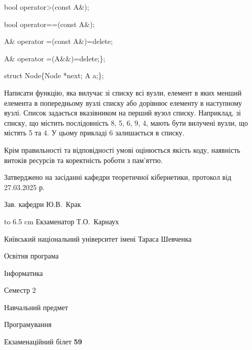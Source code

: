 \documentclass[12pt, ukrainian]{article}
\begin{document}
{\quad  bool operator>(const A\&); 

\quad  bool operator==(const A\&); 

\quad A\& operator =(const A\&)=delete; 

\quad  A\& operator =(A\&\&)=delete;\};

struct Node\{Node *next; A a;\};

 Написати функцію, яка вилучає зі списку всі вузли, елемент в яких менший елемента в попередньому вузлі списку або дорівнює елементу в наступному вузлі. Список задається вказівником на перший вузол списку. Наприклад, зі списку, що містить послідовність 8, 5, 6, 9, 4, мають бути вилучені вузли, що містять 5 та 4. У цьому прикладі 6 залишається в списку.

Крім правильності та відповідності умові оцінюється якість коду, наявність витоків ресурсів та коректність роботи з пам'яттю. 

}
{\smallskip\smallskip \begin {scriptsize} Затверджено на засіданні кафедри теоретичної кібернетики, протокол   від   27.03.2025 р.\par\smallskip\smallskip\smallskip\smallskip
{\parbox {6.5 cm} {Зав. кафедри \dotfill Ю.В.~Крак}}\hspace {0.7cm} {\hbox to 6.5 cm { Екзаменатор \dotfill Т.О.~Карнаух}} \end{scriptsize}}
\newpage
{{\begin {scriptsize}\par
{ \center  Київський національний університет імені Тараса Шевченка \par}
{\parbox {5 cm}{Освітня програма \hfill}{\parbox {7 cm}{Інформатика\hfill}}\parbox {6 cm}{\hfill Семестр 2}}\par
{\parbox {5 cm} {Навчальний предмет \hfill}\parbox {7 cm}{Програмування \hfill}\parbox {6cm}{\hfill}\par}\vspace{-15pt} \end{scriptsize}}{\center Екзаменаційний білет \No \textbf { 59 }\par}}
\end{document}
